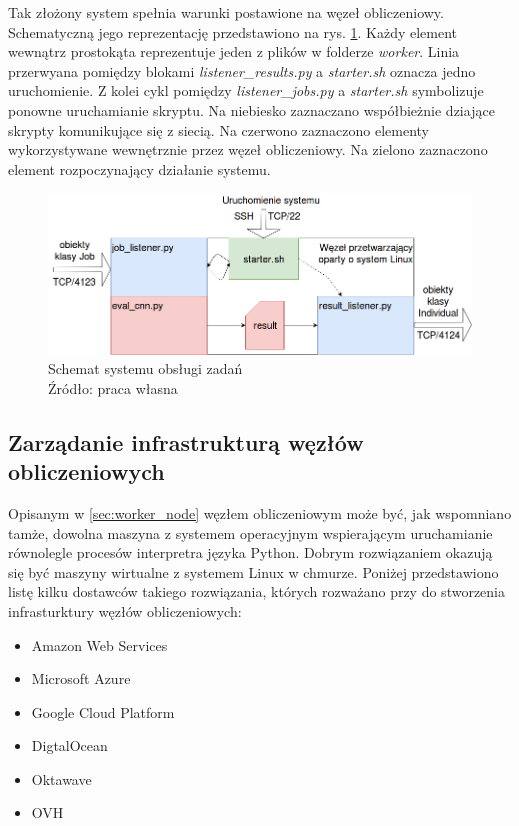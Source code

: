 Tak złożony system spełnia warunki postawione na węzeł obliczeniowy.
Schematyczną jego reprezentację przedstawiono na rys. \ref{fig:worker_node}.
Każdy element wewnątrz prostokąta reprezentuje jeden z plików w folderze \textit{worker}.
Linia przerwyana pomiędzy blokami \textit{listener\_results.py} a \textit{starter.sh} oznacza jedno uruchomienie.
Z kolei cykl pomiędzy \textit{listener\_jobs.py} a \textit{starter.sh} symbolizuje ponowne uruchamianie skryptu.
Na niebiesko zaznaczano współbieżnie dziające skrypty komunikujące się z siecią.
Na czerwono zaznaczono elementy wykorzystywane wewnętrznie przez węzeł obliczeniowy.
Na zielono zaznaczono element rozpoczynający działanie systemu.
\begin{figure}[h!tb]
	 \centering
	 \includegraphics[width = 1.0\linewidth]{img/worker_node}
	 \caption{Schemat systemu obsługi zadań \\
              Źródło: praca własna}
	 \label{fig:worker_node}
\end{figure}

\subsection{Zarządanie infrastrukturą węzłów obliczeniowych}\label{sec:azure}
Opisanym w \ref{sec:worker_node} węzłem obliczeniowym może być, jak wspomniano tamże, dowolna maszyna z systemem operacyjnym wspierającym uruchamianie równolegle procesów interpretra języka Python.
Dobrym rozwiązaniem okazują się być maszyny wirtualne z systemem Linux w chmurze.
Poniżej przedstawiono listę kilku dostawców takiego rozwiązania, których rozważano przy do stworzenia infrasturktury węzłów obliczeniowych:

\begin{itemize}
  \item Amazon Web Services
  \item Microsoft Azure
  \item Google Cloud Platform
  \item DigtalOcean
  \item Oktawave
  \item OVH
\end{itemize}

